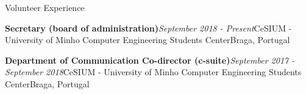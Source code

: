 \documentclass{resume}
\begin{document}
\begin{rSection}{Volunteer Experience}

\begin{rSubsection}
{\textbf{Secretary (board of administration)}}{\em September 2018 - Present}{CeSIUM - University of Minho Computer Engineering Students Center}{Braga, Portugal}
\end{rSubsection}

\begin{rSubsection}
{\textbf{Department of Communication Co-director (c-suite)}}{\em September 2017 - September 2018}{CeSIUM - University of Minho Computer Engineering Students Center}{Braga, Portugal}
\end{rSubsection}

\end{rSection}
\end{document}
